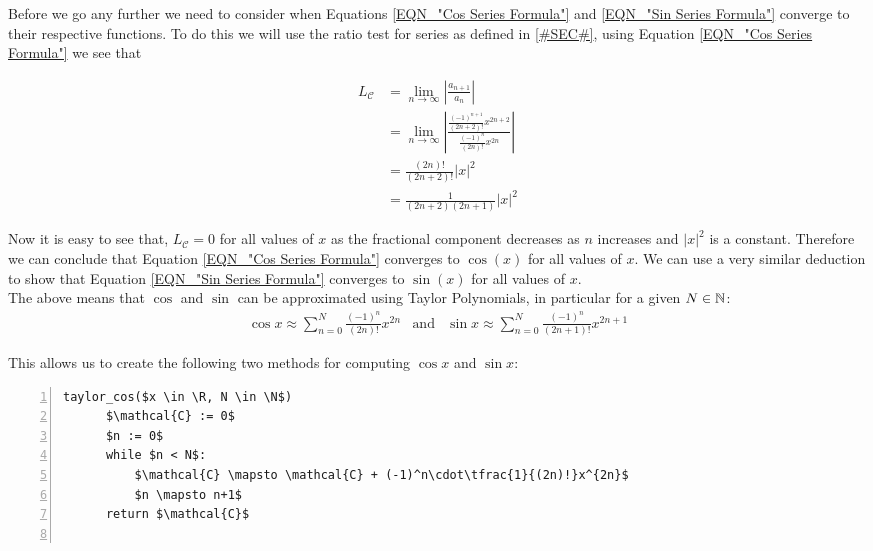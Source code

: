 {Before we go any further we need to consider when Equations \ref{EQN_"Cos Series Formula"} and \ref{EQN_"Sin Series Formula"} converge to their respective functions. To do this we will use the ratio test for series as defined in \ref{#SEC#}, using Equation \ref{EQN_"Cos Series Formula"} we see that

\begin{displaymath}
	\begin{align*}
		L_{\mathcal{C}} &= \lim_{n \to \infty} \left| 
			\frac{a_{n+1}}{a_n} \right|\\
		&= \lim_{n \to \infty} \left| 
			\frac{\frac{(-1)^{n+1}}{(2n+2)!}x^{2n+2}}
				{\frac{(-1)^n}{(2n)!}x^{2n}} \right|\\
		&=\frac{(2n)!}{(2n+2)!}|x|^2\\
		&=\frac{1}{(2n+2)(2n+1)}|x|^2
	\end{align*}
\end{displaymath}

Now it is easy to see that, \(L_{\mathcal{C}} = 0\) for all values of \(x\) as the fractional component decreases as \(n\) increases and \(|x|^2\) is a constant. Therefore we can conclude that Equation \ref{EQN_"Cos Series Formula"} converges to \(\cos(x)\) for all values of \(x\). We can use a very similar deduction to show that Equation \ref{EQN_"Sin Series Formula"} converges to \(\sin(x)\) for all values of \(x\).\\

The above means that \(\cos\) and \(\sin\) can be approximated using Taylor Polynomials, in particular for a given \(N \in \mathbb{N}\):
\begin{displaymath}
\begin{array}{rcl}
	\cos x \approx \sum_{n=0}^N \frac{(-1)^n}{(2n)!}x^{2n}
	& \textrm{and}
	&\sin x\approx \sum_{n=0}^N \frac{(-1)^n}{(2n+1)!}x^{2n+1}
\end{array}
\end{displaymath}

This allows us to create the following two methods for computing \(\cos x\) and \(\sin x\):

\begin{lstlisting}[numbers=left,frame=single,mathescape,caption={Taylor computation of \(\cos\) and \(\sin\)},label={PCD_"Taylor Cos/Sin"}]
  taylor_cos($x \in \R, N \in \N$)
      $\mathcal{C} := 0$
      $n := 0$
      while $n < N$:
          $\mathcal{C} \mapsto \mathcal{C} + (-1)^n\cdot\tfrac{1}{(2n)!}x^{2n}$
          $n \mapsto n+1$
      return $\mathcal{C}$
  

\end{lstlisting}}
